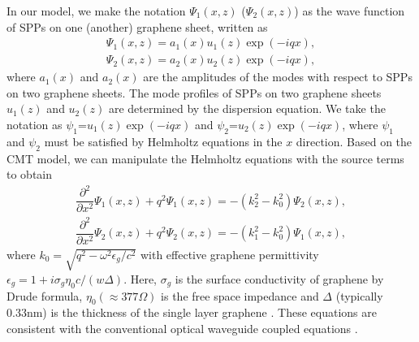 \documentclass[preprint,12pt,numbers,sort&compress]{elsarticle}
\begin{document}
In our model, we make the notation $\Psi_1(x,z)$ ($\Psi_2(x,z)$) as the wave function of SPPs on one (another) graphene sheet, written as
\begin{equation}
\begin{aligned}
\Psi_1(x,z)= a_{1}(x) u_{1}(z) \exp(-i q x), \\
\Psi_2(x,z)= a_{2}(x) u_{2}(z) \exp(-i q x),
\end{aligned}
\end{equation}
where $a_{1}(x)$ and $a_{2}(x)$ are the amplitudes of the modes with respect to SPPs on two graphene sheets. The mode profiles of SPPs on two graphene sheets $u_{1}(z)$ and $u_{2}(z)$ are determined by the dispersion equation. We take the notation as $\psi_{1}$=$u_{1}(z) \exp(-i q x)$ and $\psi_{2}$=$u_{2}(z) \exp(-i q x)$, where $\psi_{1}$ and $\psi_{2}$ must be satisfied by Helmholtz equations in the $x$ direction.
Based on the CMT model, we can manipulate the Helmholtz equations with the source terms to obtain
\begin{equation}
\begin{aligned}
\dfrac{\partial^2}{\partial x^2} \Psi_{1}(x,z) + q^2 \Psi_{1}(x,z) = -(k_{2}^2 - k_0^2)\Psi_{2}(x,z), \\
\dfrac{\partial^2}{\partial x^2} \Psi_{2}(x,z) + q^2 \Psi_{2}(x,z) = -(k_{1}^2 - k_0^2)\Psi_{1}(x,z),
\end{aligned}
\end{equation}
where $k_0=\sqrt{q^2 - \omega^2 \epsilon_{g} / c^2}$ with effective graphene permittivity $\epsilon_{g}=1+i \sigma_g \eta_0 c / (w \Delta)$. Here,  $\sigma_g$ is the surface conductivity of graphene by Drude formula, $\eta_0 (\approx 377 \Omega)$ is the free space impedance and $\Delta$ (typically 0.33nm) is the thickness of the single layer graphene \cite{Merano16}. These equations are consistent with the conventional optical waveguide coupled equations \cite{Saleh91}.
\end{document}
